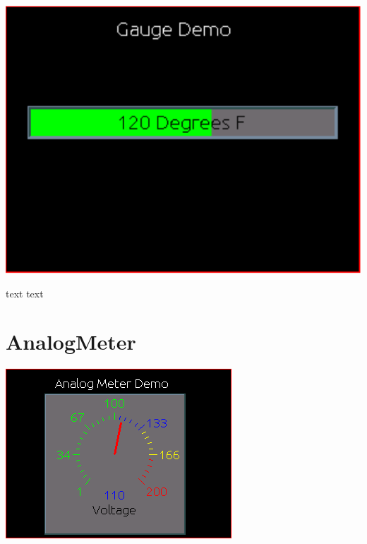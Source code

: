 \begin{DoxyImageNoCaption}
  \mbox{\includegraphics{gauge}}
\end{DoxyImageNoCaption}
 

text text\par
 \hypertarget{d0/d90/intro_widgets_analogMeter}{}\section{Analog\-Meter}\label{d0/d90/intro_widgets_analogMeter}
 
\begin{DoxyImageNoCaption}
  \mbox{\includegraphics{AnalogMeterFull.png}}
\end{DoxyImageNoCaption}
 


